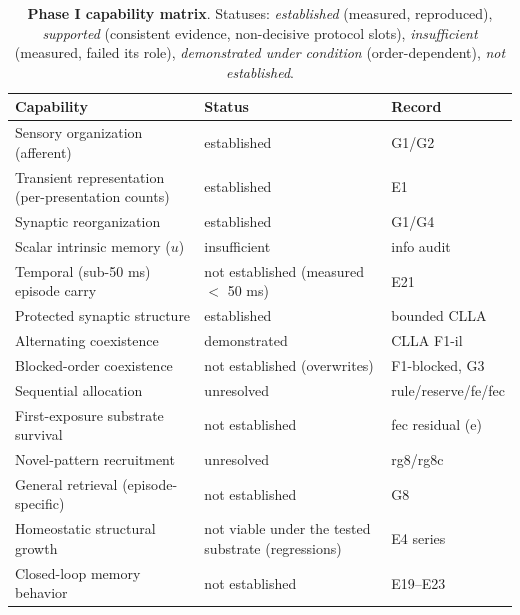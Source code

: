 \begin{table}[t]
\centering
\caption{\textbf{Phase I capability matrix}. Statuses: \emph{established}
(measured, reproduced), \emph{supported} (consistent evidence,
non-decisive protocol slots), \emph{insufficient} (measured, failed its
role), \emph{demonstrated under condition} (order-dependent),
\emph{not established}.}
\label{tab:capability}
\footnotesize
\begin{tabular}{p{3.4cm}p{5.4cm}p{6.4cm}}
\toprule
Capability & Status & Record \\
\midrule
Sensory organization (afferent) & established & G1/G2 \cite{synmem} \\
Transient representation (per-presentation counts) & established & E1 \cite{e1proto} \\
Synaptic reorganization & established & G1/G4 \cite{synmem} \\
Scalar intrinsic memory (\(u\)) & insufficient & info audit \cite{infoaudit} \\
Temporal (sub-50 ms) episode carry & not established (measured \(<\) 50 ms) & E21 \cite{overview} \\
Protected synaptic structure & established & bounded CLLA \cite{bbounded} \\
Alternating coexistence & demonstrated & CLLA F1-il \cite{capability} \\
Blocked-order coexistence & not established (overwrites) & F1-blocked, G3 \cite{capability,synmem} \\
Sequential allocation & unresolved & rule/reserve/fe/fec \cite{rule,reserve,fe,fec} \\
First-exposure substrate survival & not established & fec residual (e) \cite{fec} \\
Novel-pattern recruitment & unresolved & rg8/rg8c \cite{rg8,rg8c} \\
General retrieval (episode-specific) & not established & G8 \cite{synmem} \\
Homeostatic structural growth & not viable under the tested substrate (regressions) & E4 series \cite{e4proto} \\
Closed-loop memory behavior & not established & E19--E23 \cite{overview} \\
\bottomrule
\end{tabular}
\end{table}
